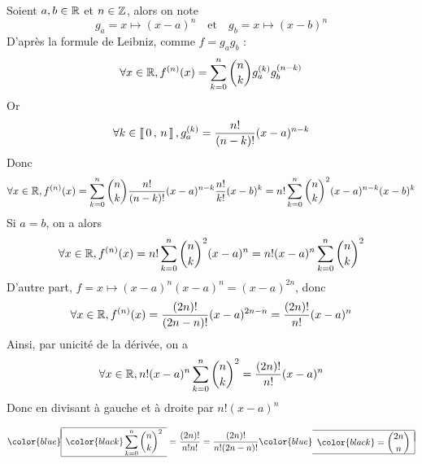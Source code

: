 \documentclass{fancybook}
\newcommand{\lboxed}[1]{{\color{blue}\begin{array}{|l}\hline\\[-2.4ex]{\color{black}#1}\\[1.2ex]\hline\end{array}}}
\newcommand{\rboxed}[1]{{\color{blue}\begin{array}{r|}\hline\\[-2.4ex]{\color{black}#1}\\[1.2ex]\hline\end{array}}}
\begin{document}
\begin{solution}
Soient $a,b\in\mathbb{R}$ et $n \in \mathbb{Z}$, alors on note 
\[
g_a = x\longmapsto (x-a)^n \quad\text{et}\quad g_b = x \longmapsto (x-b)^n
\]
D'après la formule de Leibniz, comme $f = g_a g_b$ :
\[
\forall x \in \mathbb{R},f^{(n)}(x) = \sum\limits_{k=0}^{n} \binom{n}{k} g_a^{(k)} g_b^{(n-k)}
\]
Or 
\[
\forall k \in \left\llbracket \, 0 \, , \, n \, \right\rrbracket, g_a^{(k)} = \dfrac{n!}{(n-k)!} (x-a)^{n-k}
\]
Donc 
\[
\forall x \in \mathbb{R},f^{(n)}(x) 
= \sum\limits_{k=0}^{n} \binom{n}{k}  \dfrac{n!}{(n-k)!} (x-a)^{n-k}  \dfrac{n!}{k!} (x-b)^{k}
= n! \sum\limits_{k=0}^{n} \binom{n}{k}^2  (x-a)^{n-k} (x-b)^{k}
\]
Si $a = b$, on a alors
\[
\forall x \in \mathbb{R},f^{(n)}(x) 
= n! \sum\limits_{k=0}^{n} \binom{n}{k}^2 (x-a)^{n}
=n!(x-a)^{n}\sum\limits_{k=0}^{n} \binom{n}{k}^2
\]
D'autre part, $f = x \longmapsto (x-a)^n (x-a)^n = (x-a)^{2n}$, donc 
\[
\forall x \in \mathbb{R},f^{(n)}(x) 
=  \dfrac{(2n)!}{(2n-n)!} (x-a)^{2n-n} =   \dfrac{(2n)!}{n!} (x-a)^{n}
\]
Ainsi, par unicité de la dérivée, on a 
\[
\forall x \in \mathbb{R},
n!(x-a)^{n}\sum\limits_{k=0}^{n} \binom{n}{k}^2 = \dfrac{(2n)!}{n!} (x-a)^{n}
\]
Donc en divisant à gauche et à droite par $n!(x-a)^{n}$

\[
\lboxed{\displaystyle\sum\limits_{k=0}^{n} \binom{n}{k}^2}
= \dfrac{(2n)!}{n!n!}
= \dfrac{(2n)!}{n!(2n-n)!} 
\rboxed{= \displaystyle\binom{2n}{n}}
\]
\end{solution}

\newpage
\pagestyle{default}
\end{document}
